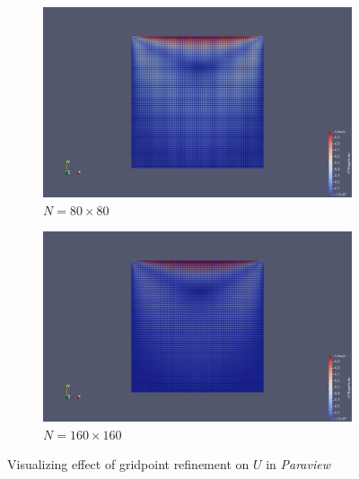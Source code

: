 \documentclass[11pt]{article}
\begin{document}
\begin{figure}[H]
   \begin{subfigure}{0.495\linewidth}
      \includegraphics[width=\linewidth]{images/paraview_U_80.png}
      \caption{$N = 80 \times 80$}
   \end{subfigure}
   \begin{subfigure}{0.495\linewidth}
      \includegraphics[width=\linewidth]{images/paraview_U_160.png}
      \caption{$N = 160 \times 160$}
   \end{subfigure}
   \caption{Visualizing effect of gridpoint refinement on $U$ in \textit{Paraview}}
   \label{paraviewrefine}
\end{figure}
   
\end{document}
